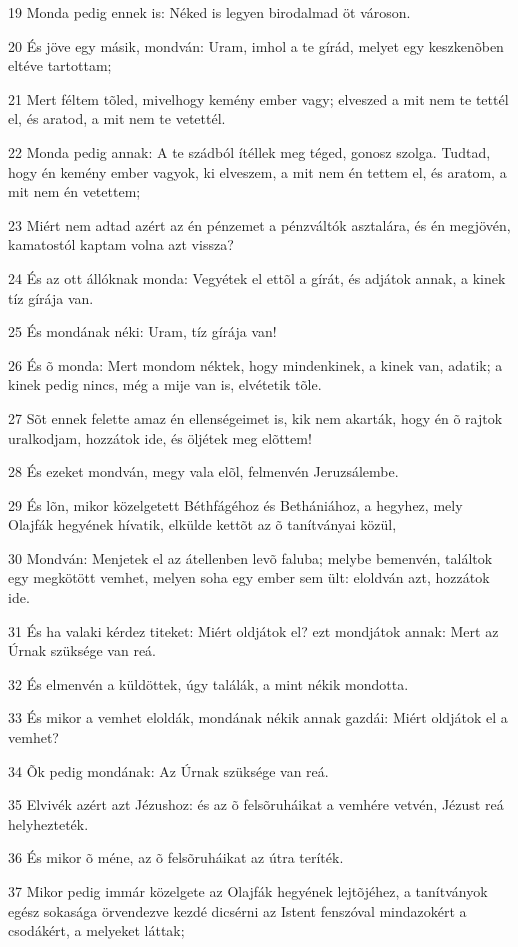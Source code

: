 \par 19 Monda pedig ennek is: Néked is legyen birodalmad öt városon.
\par 20 És jöve egy másik, mondván: Uram, imhol a te gírád, melyet egy keszkenõben eltéve tartottam;
\par 21 Mert féltem tõled, mivelhogy kemény ember vagy; elveszed a mit nem te tettél el, és aratod, a mit nem te vetettél.
\par 22 Monda pedig annak: A te szádból ítéllek meg téged, gonosz szolga. Tudtad, hogy én kemény ember vagyok, ki elveszem, a mit nem én tettem el, és aratom, a mit nem én vetettem;
\par 23 Miért nem adtad azért az én pénzemet a pénzváltók asztalára, és én megjövén, kamatostól kaptam volna azt vissza?
\par 24 És az ott állóknak monda: Vegyétek el ettõl a gírát, és adjátok annak, a kinek tíz gírája van.
\par 25 És mondának néki: Uram, tíz gírája van!
\par 26 És õ monda: Mert mondom néktek, hogy mindenkinek, a kinek van, adatik; a kinek pedig nincs, még a mije van is, elvétetik tõle.
\par 27 Sõt ennek felette amaz én ellenségeimet is, kik nem akarták, hogy én õ rajtok uralkodjam, hozzátok ide, és öljétek meg elõttem!
\par 28 És ezeket mondván, megy vala elõl, felmenvén Jeruzsálembe.
\par 29 És lõn, mikor közelgetett Béthfágéhoz és Bethániához, a hegyhez, mely Olajfák hegyének hívatik, elkülde kettõt az õ tanítványai közül,
\par 30 Mondván: Menjetek el az átellenben levõ faluba; melybe bemenvén, találtok egy megkötött vemhet, melyen soha egy ember sem ült: eloldván azt, hozzátok ide.
\par 31 És ha valaki kérdez titeket: Miért oldjátok el? ezt mondjátok annak: Mert az Úrnak szüksége van reá.
\par 32 És elmenvén a küldöttek, úgy találák, a mint nékik mondotta.
\par 33 És mikor a vemhet eloldák, mondának nékik annak gazdái: Miért oldjátok el a vemhet?
\par 34 Õk pedig mondának: Az Úrnak szüksége van reá.
\par 35 Elvivék azért azt Jézushoz: és az õ felsõruháikat a vemhére vetvén, Jézust reá helyhezteték.
\par 36 És mikor õ méne, az õ felsõruháikat az útra teríték.
\par 37 Mikor pedig immár közelgete az Olajfák hegyének lejtõjéhez, a tanítványok egész sokasága örvendezve kezdé dicsérni az Istent fenszóval mindazokért a csodákért, a melyeket láttak;
